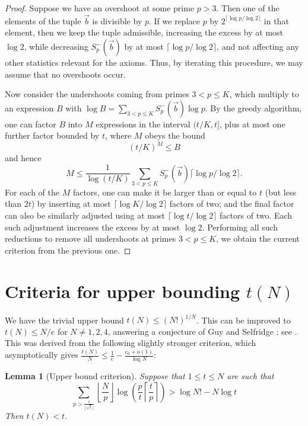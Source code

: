 \documentclass[12pt,a4paper,reqno]{amsart}
\numberwithin{equation}{section}
\theoremstyle{plain}
\newtheorem{lemma}[theorem]{Lemma}
\theoremstyle{definition}
\begin{document}
\begin{proof} Suppose we have an overshoot at some prime $p>3$.  Then one of the elements of the tuple $\vec b$ is divisible by $p$.  If we replace $p$ by $2^{\lceil \log p/\log 2 \rceil}$ in that element, then we keep the tuple admissible, increasing the excess by at most $\log 2$, while decreasing $S^-_p(\vec b)$ by at most $\lceil \log p/\log 2 \rceil$, and not affecting any other statistics relevant for the axioms.  Thus, by iterating this procedure, we may assume that no overshoots occur.

  Now consider the undershoots coming from primes $3 < p \leq K$, which multiply to an expression $B$ with $\log B = \sum_{3 < p \leq K} S^-_p(\vec b) \log p$.  By the greedy algorithm, one can factor $B$ into $M$ expressions in the interval $(t/K,t]$, plus at most one further factor bounded by $t$, where $M$ obeys the bound
  $$ (t/K)^M \leq B$$
  and hence
  $$ M \leq \frac{1}{\log(t/K)} \sum_{3 < p \leq K} S^-_p(\vec b)  \lceil \log p/\log 2 \rceil.$$
For each of the $M$ factors, one can make it be larger than or equal to $t$ (but less than $2t$) by inserting at most $\lceil \log K/\log 2 \rceil$ factors of two; and the final factor can also be similarly adjusted using at most $\lceil \log t/\log 2\rceil$ factors of two.  Each such adjustment increases the excess by at most $\log 2$.  Performing all such reductions to remove all undershoots at primes $3 < p \leq K$, we obtain the current criterion from the previous one.
\end{proof}
  
  
\section{Criteria for upper bounding $t(N)$}

We have the trivial upper bound $t(N) \leq (N!)^{1/N}$.  This can be improved to $t(N) \leq N/e$ for $N \neq 1,2,4$, answering a conjecture of Guy and Selfridge \cite{guy-selfridge}; see \cite{tao}.  This was derived from the following slightly stronger criterion, which asymptotically gives $\frac{t(N)}{N} \leq \frac{1}{e} - \frac{c_0+o(1)}{\log N}$:

\begin{lemma}[Upper bound criterion]\label{upper-crit}  \cite[Lemma 2.1]{tao} Suppose that $1 \leq t \leq N$ are such that
  \begin{equation}\label{contra}
     \sum_{p > \frac{t}{\lfloor\sqrt{t}\rfloor}} \left\lfloor \frac{N}{p} \right\rfloor \log \left( \frac{p}{t} \left\lceil \frac{t}{p} \right\rceil \right) > \log N! - N \log t
  \end{equation}
  Then $t(N) < t$.
  \end{lemma}
\end{document}
